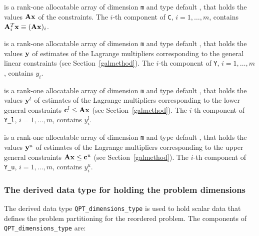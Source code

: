\documentclass{galahad}
\begin{document}
\begin{description}
 is a rank-one allocatable array of dimension {\tt m} and type default
\realdp, that holds
the values ${\mathbf{A}} {\mathbf{x}}$ of the constraints.
The $i$-th component of {\tt C}, $i = 1,  \ldots ,  m$, contains
${\mathbf{A}}_{i}^{T}{\mathbf{x}} \equiv ({\mathbf{A}} {\mathbf{x}})_{i}$.

 is a rank-one allocatable array of dimension {\tt m} and type
default \realdp, that holds
the values ${\mathbf{y}}$ of estimates  of the Lagrange multipliers
corresponding to the general linear constraints (see Section~\ref{galmethod}).
The $i$-th component of {\tt Y}, $i = 1,  \ldots ,  m$, contains $y_{i}$.

 is a rank-one allocatable array of dimension {\tt m} and
type default \realdp, that holds
the values ${\mathbf{y}}^{l}$ of estimates  of the Lagrange multipliers
corresponding to the lower general constraints ${\mathbf{c}}^{l} \leq {\mathbf{A}} {\mathbf{x}}$
(see Section~\ref{galmethod}).
The $i$-th component of {\tt Y\_l}, $i = 1,  \ldots ,  m$,
contains $y_{i}^{l}$.

 is a rank-one allocatable array of dimension {\tt m} and
type default \realdp, that holds
the values ${\mathbf{y}}^{u}$ of estimates  of the Lagrange multipliers
corresponding to the upper general constraints ${\mathbf{A}} {\mathbf{x}} \leq {\mathbf{c}}^{u}$
(see Section~\ref{galmethod}).
The $i$-th component of {\tt Y\_u}, $i = 1,  \ldots ,  m$,
contains $y_{i}^{u}$.

\end{description}



\subsubsection{The derived data type for holding the problem dimensions}
\label{typeprob}
The derived data type
{\tt QPT\_dimensions\_type}
is used to hold scalar data that defines the problem partitioning for the
reordered problem.
The components of
{\tt QPT\_dimensions\_type}
are:
\end{document}
